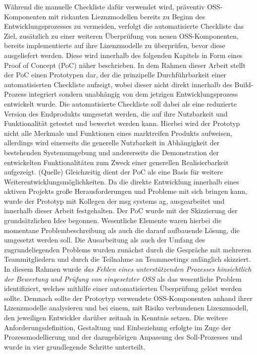 Während die manuelle Checkliste dafür verwendet wird, präventiv OSS-Komponenten mit riskanten Lieznzmodellen bereits zu Beginn des Entwicklungsprozesses zu vermeiden, verfolgt die automatisierte Checkliste das Ziel, zusätzlich zu einer weiteren Überprüfung von neuen OSS-Komponenten, bereits implementierte auf ihre Lizenzmodelle zu überprüfen, bevor diese ausgeliefert werden. Diese wird innerhalb des folgenden Kapitels in Form eines Proof of Concept (PoC) näher beschrieben. In dem Rahmen dieser Arbeit stellt der PoC einen Prototypen dar, der die prinzipelle Durchführbarkeit einer automatisierten Checkliste aufzeigt, wobei dieser nicht direkt innerhalb des Build-Prozess integriert sondern unabhängig von dem jetzigen Entwicklungsprozess entwickelt wurde. Die automatisierte Checkliste soll dabei als eine reduzierte Version des Endprodukts umgesetzt werden, die auf ihre Nutzbarkeit und Funktionalität getestet und bewertet werden kann. Hierbei wird der Prototyp nicht alle Merkmale und Funktionen eines marktreifen Produkts aufweisen, allerdings wird einerseits die generelle Nutzbarkeit in Abhängigkeit der bestehenden Systemumgebung und andererseits die Demonstration der entwickelten Funktionalitäten zum Zweck einer generellen Realisierbarkeit aufgezeigt. (Quelle) Gleichzeitig dient der PoC als eine Basis für weitere Weiterentwicklungsmöglichkeiten. Da die direkte Entwicklung innerhalb eines aktiven Projekts große Herausforderungen und Probleme mit sich bringen kann, wurde der Prototyp mit Kollegen der msg systems ag, ausgearbeitet und innerhalb dieser Arbeit festgehalten. Der PoC wurde mit der Skizzierung der grundsätzlichen Idee begonnen. Wesentliche Elemente waren hierbei die momentane Problembeschreibung als auch die darauf aufbauende Lösung, die umgesetzt werden soll. Die Ausarbeitung als auch der Umfang des zugrundeliegenden Problems wurden zunächst durch die Gespräche mit mehreren Teammitgliedern und durch die Teilnahme an Teammeetings anfänglich skizziert. In diesem Rahmen wurde \textit{das Fehlen eines unterstützenden Prozesses hinsichtlich der Bewertung und Prüfung von eingesetzter OSS} als das wesentliche Problem identifiziert, welches mithilfe einer automatisierten Überprüfung gelöst werden sollte. Demnach sollte der Protoytyp verwendete OSS-Komponenten anhand ihrer Lizenzmodelle analysieren und bei einem, mit Risiko verbundenen Lizenzmodell, den jeweiligen Entwickler darüber zeitnah in Kenntnis setzen. Die weitere Anforderungsdefinition, Gestaltung und Einbeziehung erfolgte im Zuge der Prozessmodellierung und der dazugehörigen Anpassung des Soll-Prozesses und wurde in vier grundlegende Schritte unterteilt.



